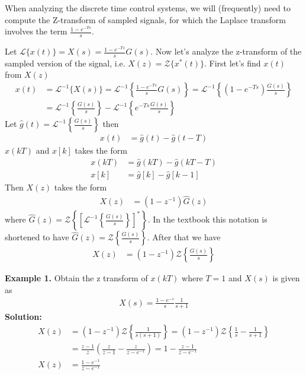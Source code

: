 \documentclass[twoside]{article}
\begin{document}
When analyzing the discrete time control systems,
we will (frequently) need to compute the Z-transform of sampled
signals, for which the Laplace transform involves the 
term $\frac{1 - e^{-Ts}}{s}$. 

Let $\mathcal{L} \lbrace x(t) \rbrace=  X(s) = \frac{1 - e^{-T s}}{s}
G(s)$. Now let's analyze the z-transform of the sampled version 
of the signal, i.e. $X(z) = \mathcal{Z} \lbrace x^*(t) \rbrace$.
First let's find $x(t)$ from $X(z)$
%
\begin{align*}
x(t) &= \mathcal{L}^{-1} \lbrace X(s) \rbrace
    = \mathcal{L}^{-1} \left\lbrace \frac{1 - e^{-T
  s}}{s} G(s) \right\rbrace = \mathcal{L}^{-1} \left\lbrace (1 -
  e^{-Ts}) \frac{G(s)}{s} \right\rbrace
\\
&=  \mathcal{L}^{-1} \left\lbrace \frac{G(s)}{s} \right\rbrace
- \mathcal{L}^{-1} \left\lbrace e^{-Ts} \frac{G(s)}{s} \right\rbrace
 \end{align*}
%
Let $\hat{g}(t) = \mathcal{L}^{-1} \left\lbrace \frac{G(s)}{s}
\right\rbrace$ then
%
\begin{align*}
x(t) &= \hat{g}(t) - \hat{g}(t-T)
 \end{align*}
%
$x(kT)$ and $x[k]$ takes the form
%
\begin{align*}
x(k T) &= \hat{g}(k T) - \hat{g}(kT -T)
\\
x[k] &= \hat{g}[k] - \hat{g}[k-1]
 \end{align*}
%
Then $X(z)$ takes the form
%
\begin{align*}
X(z) &= \left( 1 - z^{-1} \right) \hat{G}(z) 
 \end{align*}
%
where $\hat{G}(z) = \mathcal{Z} \left\lbrace \left[ \mathcal{L}^{-1}
  \left\lbrace \frac{G(s)}{s} \right\rbrace \right]^* \right\rbrace$.
In the textbook this notation is shortened to have
$\hat{G}(z) = \mathcal{Z} \left\lbrace \frac{G(s)}{s} \right\rbrace$.
After that we have
%
\begin{align*}
X(z) &= \left( 1 - z^{-1} \right) \mathcal{Z} \left\lbrace \frac{G(s)}{s} \right\rbrace
 \end{align*}
%

\textbf{Example 1.} Obtain the z transform of $x(kT)$ where $T=1$ and $X(s)$ is
given as
%
\begin{align*}
  X(s) = \frac{1 - e^{-s}}{s} \frac{1}{s+1}
\end{align*}
%
\textbf{Solution:}
%
\begin{align*}
  X(z) &= \left( 1 - z^{-1} \right) \mathcal{Z} \left\lbrace \frac{1}{s(s+1)}
  \right\rbrace
= \left( 1 - z^{-1} \right) \mathcal{Z} \left\lbrace \frac{1}{s} -
  \frac{1}{s+1} \right\rbrace
\\
&= \frac{z-1}{z} \left( \frac{z}{z-1} - \frac{z}{z-e^{-1}}  \right)
= 1 - \frac{z-1}{z-e^{-1}} \\
X(z) &= \frac{1-e^{-1}}{z-e^{-1}}
\end{align*}
\end{document}
